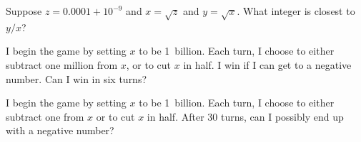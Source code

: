 \documentclass{ximera}
\begin{document}
\begin{problem}
  Suppose $z = 0.0001 + 10^{-9}$ and $x = \sqrt{z}$ and $y = \sqrt{x}$.  What integer is closest to $y/x$?
  \begin{multipleChoice}
  \end{multipleChoice}
\end{problem}

\begin{problem}
  I begin the game by setting $x$ to be 1~billion.  Each turn, I
  choose to either subtract one million from $x$, or to cut $x$ in
  half.  I win if I can get to a negative number.  Can I win in six
  turns?
  \begin{multipleChoice}
  \end{multipleChoice}
\end{problem}

\begin{problem}
  I begin the game by setting $x$ to be 1~billion.  Each turn, I
  choose to either subtract one from $x$ or to cut $x$ in half.  After
  30 turns, can I possibly end up with a negative number?
  \begin{multipleChoice}
  \end{multipleChoice}
\end{problem}
\end{document}
